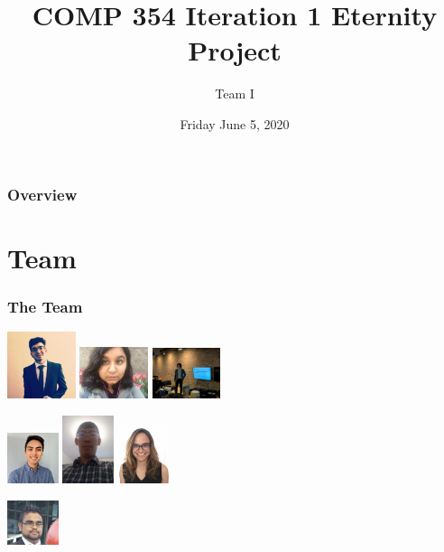 \documentclass{beamer}
\title{COMP 354 Iteration 1 Eternity Project}
\author
{
Team I
}
\institute{Concordia University}
\date{Friday June 5, 2020}
\begin{document}
\frame{\titlepage}
\begin{frame}
\frametitle{Overview}
\tableofcontents
\end{frame}

\section{Team}

\begin{frame}
\frametitle{The Team}
  \hfil\hfil\includegraphics[width=2cm]{Avnish}
  \hfil\hfil
    \includegraphics[width=2cm]{Swati}
    \hfil\hfil
    \includegraphics[width=2cm]{Emanuel}
    \newline
  \null\hfil\hfil{}
    \hfil\hfil{}  
     \hfil\hfil{} 
    
    \bigskip
    
  \hfil\hfil\includegraphics[width=1.5cm]{Clement}
  \hfil\hfil
    \includegraphics[width=1.5cm]{Nguyen}
    \hfil\hfil
    \includegraphics[width=1.5cm]{Tara}
    \newline
  \null\hfil\hfil{}
    \hfil\hfil{}  
     \hfil\hfil{} 
     \bigskip
      \bigskip
      
           \hfil\hfil\includegraphics[width=1.5cm]{Anik}\newline
  \null\hfil\hfil{}\newline
\end{frame}
\end{document}
